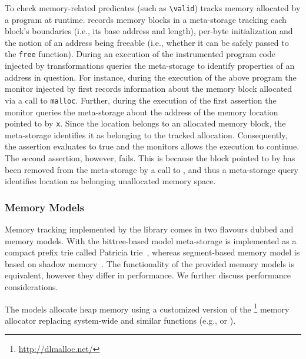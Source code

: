 To check memory-related predicates (such as \lstinline|\valid|) \eacsl tracks
memory allocated by a program at runtime. \eacsl records memory blocks in a
meta-storage tracking each block's boundaries (i.e., its base address and
length), per-byte initialization and the notion of an address being freeable
(i.e., whether it can be safely passed to the \texttt{free} function).  During
an execution of the instrumented program code injected by \eacsl
transformations queries the meta-storage to identify properties of an address
in question.  For instance, during the execution of the above program the
monitor injected by \eacsl first records information about the memory block
allocated via a call to \texttt{malloc}.  Further, during the execution of the
first assertion the monitor queries the meta-storage about the address of the
memory location pointed to by \texttt{x}.  Since the location belongs to an
allocated memory block, the meta-storage identifies it as belonging to the
tracked allocation.  Consequently, the assertion evaluates to true and the
monitors allows the execution to continue.  The second assertion, however,
fails. This is because the block pointed to by  has been removed from the
meta-storage by a call to , and thus a meta-storage query identifies
location  as belonging unallocated memory space.

\subsubsection{\eacsl Memory Models}

Memory tracking implemented by the \eacsl library comes in two flavours dubbed
 and  memory models. With the bittree-based
model meta-storage is implemented as a compact prefix trie called Patricia
trie~\cite{rv13}, whereas segment-based memory model is based on shadow
memory~\cite{vorobyov17ismm}. The functionality of the provided memory models is
equivalent, however they differ in performance. We further discuss performance
considerations.

The \eacsl models allocate heap memory using a customized version of the
\dlmalloc\footnote{\url{http://dlmalloc.net/}} memory allocator replacing
system-wide  and similar functions (e.g.,  or ).


